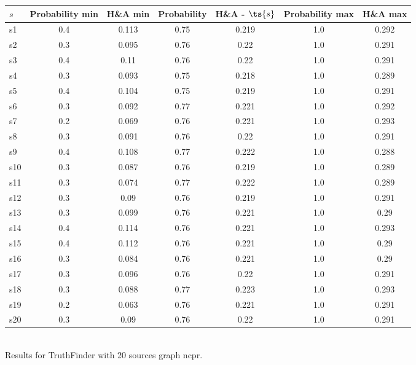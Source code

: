 \documentclass{article}
\begin{document}
\noindent\begin{tabular}{|l|c|c|c|c|c|c|}
\hline
$s$& Probability min & H\&A min & Probability & H\&A - $\ts{s}$ & Probability max & H\&A max\\
\hline
s1 &0.4 & 0.113 & 0.75 & 0.219 & 1.0 & 0.292\\
\hline
s2 &0.3 & 0.095 & 0.76 & 0.22 & 1.0 & 0.291\\
\hline
s3 &0.4 & 0.11 & 0.76 & 0.22 & 1.0 & 0.291\\
\hline
s4 &0.3 & 0.093 & 0.75 & 0.218 & 1.0 & 0.289\\
\hline
s5 &0.4 & 0.104 & 0.75 & 0.219 & 1.0 & 0.291\\
\hline
s6 &0.3 & 0.092 & 0.77 & 0.221 & 1.0 & 0.292\\
\hline
s7 &0.2 & 0.069 & 0.76 & 0.221 & 1.0 & 0.293\\
\hline
s8 &0.3 & 0.091 & 0.76 & 0.22 & 1.0 & 0.291\\
\hline
s9 &0.4 & 0.108 & 0.77 & 0.222 & 1.0 & 0.288\\
\hline
s10 &0.3 & 0.087 & 0.76 & 0.219 & 1.0 & 0.289\\
\hline
s11 &0.3 & 0.074 & 0.77 & 0.222 & 1.0 & 0.289\\
\hline
s12 &0.3 & 0.09 & 0.76 & 0.219 & 1.0 & 0.291\\
\hline
s13 &0.3 & 0.099 & 0.76 & 0.221 & 1.0 & 0.29\\
\hline
s14 &0.4 & 0.114 & 0.76 & 0.221 & 1.0 & 0.293\\
\hline
s15 &0.4 & 0.112 & 0.76 & 0.221 & 1.0 & 0.29\\
\hline
s16 &0.3 & 0.084 & 0.76 & 0.221 & 1.0 & 0.29\\
\hline
s17 &0.3 & 0.096 & 0.76 & 0.22 & 1.0 & 0.291\\
\hline
s18 &0.3 & 0.088 & 0.77 & 0.223 & 1.0 & 0.293\\
\hline
s19 &0.2 & 0.063 & 0.76 & 0.221 & 1.0 & 0.291\\
\hline
s20 &0.3 & 0.09 & 0.76 & 0.22 & 1.0 & 0.291\\
\hline
\end{tabular}\\

\noindent Results for TruthFinder with 20 sources graph ncpr.
\end{document}
